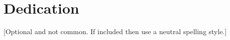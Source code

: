 \documentclass[Bachelorarbeit.tex]{subfiles}
\begin{document}
\chapter*{Dedication}
[Optional and not common. If included then use a neutral spelling style.]
\end{document}
